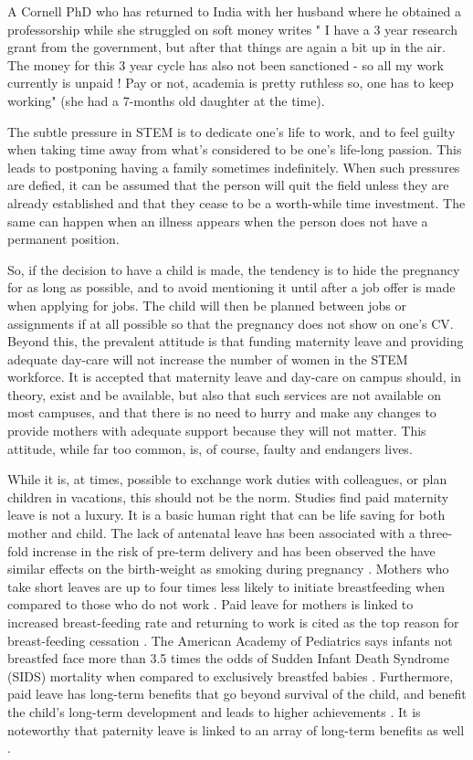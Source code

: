 \documentclass[utf8]{frontiersSCNS} %
\begin{document}
A Cornell PhD who has returned to India with her husband where he obtained a professorship while she struggled on soft money writes " I have a 3 year research grant from the government, but after that things are again a bit up in the air. The money for this 3 year cycle has also not been sanctioned - so all my work currently is unpaid ! Pay or not, academia is pretty ruthless so, one has to keep working" (she had a 7-months old daughter at the time). 

The subtle pressure in STEM is to dedicate one's life to work, and to feel guilty when taking time away from what's considered to be one's life-long passion. This leads to postponing having a family sometimes indefinitely. When such pressures are defied, it can be assumed that the person will quit the field unless they are already established and that they cease to be a worth-while time investment. The same can happen when an illness appears when the person does not have a permanent position.

So, if the decision to have a child is made, the tendency is to hide the pregnancy for as long as possible, and to avoid mentioning it until after a job offer is made when applying for jobs. The child will then be planned between jobs or assignments if at all possible so that the pregnancy does not show on one's CV. Beyond this, the prevalent attitude is that funding maternity leave and providing adequate day-care will not increase the number of women in the STEM workforce. It is accepted that maternity leave and day-care on campus should, in theory, exist and be available, but also that such services are not available on most campuses, and that there is no need to hurry and make any changes to provide mothers with adequate support because they will not matter. This attitude, while far too common, is, of course, faulty and endangers lives.

While it is, at times, possible to exchange work duties with colleagues, or plan children in vacations, this should not be the norm.  Studies find paid maternity leave is not a luxury. It is a basic human right that can be life saving for both mother and child. The lack of antenatal leave has been associated with a three-fold increase in the risk of pre-term delivery and has been observed the have similar effects on the birth-weight as smoking during pregnancy \citep{ceron1996risk,del2012intrafamily}. Mothers who take short leaves are up to four times less likely to initiate breastfeeding when compared to those who do not work \citep{huang2015paid,baker2008maternal}. Paid leave for mothers is linked to increased breast-feeding rate and returning to work is cited as the top reason for breast-feeding cessation \citep{schwartz2002factors}. The American Academy of Pediatrics says infants not breastfed face more than 3.5 times the odds of Sudden Infant Death Syndrome (SIDS) mortality when compared to exclusively breastfed babies \citep{eidelman2012breastfeeding}. Furthermore, paid leave has long-term benefits that go beyond survival of the child, and benefit the child's long-term development and leads to higher achievements \citep{berger2005maternity,carneiro2015flying}. It is noteworthy that paternity leave is linked to an array of long-term benefits as well \citep{huerta2013fathers}.
\end{document}
